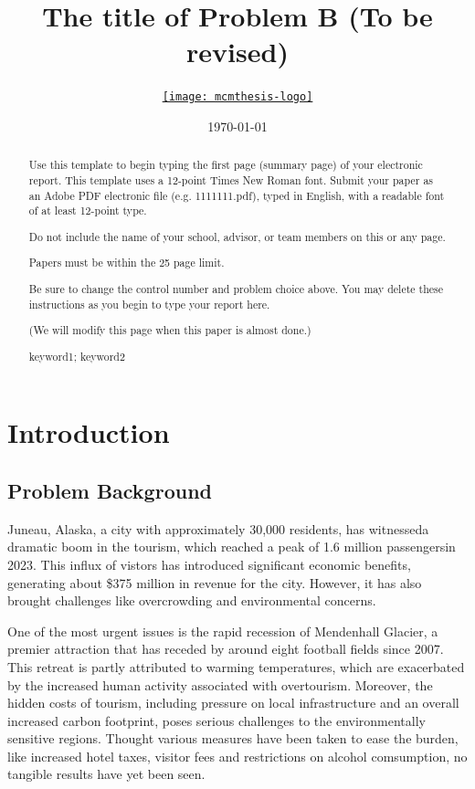 \documentclass{mcmthesis}
\title{The title of Problem B (To be revised)}
\author{\small \href{https://www.latexstudio.net/}
  {\texttt{[image: mcmthesis-logo]}}}
\date{\today}
\begin{document}
\begin{abstract}
\par 
Use this template to begin typing the first page (summary page) of your electronic report. This template uses a 12-point Times New Roman font. Submit your paper as an Adobe PDF electronic file (e.g. 1111111.pdf), typed in English, with a readable font of at least 12-point type.

Do not include the name of your school, advisor, or team members on this or any page.

Papers must be within the 25 page limit.

Be sure to change the control number and problem choice above.
You may delete these instructions as you begin to type your report here.

(We will modify this page when this paper is almost done.)
\begin{keywords}
keyword1; keyword2
\end{keywords}
\end{abstract}
\maketitle
\tableofcontents
\newpage
%
\section{Introduction}
\subsection{Problem Background}
Juneau, Alaska, a city with approximately 30,000 residents, has witnesseda dramatic boom in the tourism, which reached a peak of 1.6 million passengersin 2023. 
This influx of vistors has introduced significant economic benefits, generating about \$375 million in revenue for the city. 
However, it has also brought challenges like overcrowding and environmental concerns.

One of the most urgent issues is the rapid recession of Mendenhall Glacier, a premier attraction that has receded by around eight football fields since 2007. 
This retreat is partly attributed to warming temperatures, which are exacerbated by the increased human activity associated with overtourism. 
Moreover, the hidden costs of tourism, including pressure on local infrastructure and an overall increased carbon footprint, poses serious challenges to the environmentally sensitive regions. 
Thought various measures have been taken to ease the burden, like increased hotel taxes, visitor fees and restrictions on alcohol comsumption, no tangible results have yet been seen.
\end{document}
